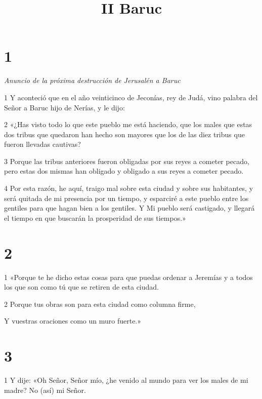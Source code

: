 

\title{II Baruc}

\chapter{1}

\par \textit{Anuncio de la próxima destrucción de Jerusalén a Baruc}

\par 1 Y aconteció que en el año veinticinco de Jeconías, rey de Judá, vino palabra del Señor a Baruc hijo de Nerías, y le dijo:

\par 2 «¿Has visto todo lo que este pueblo me está haciendo, que los males que estas dos tribus que quedaron han hecho son mayores que los de las diez tribus que fueron llevadas cautivas?

\par 3 Porque las tribus anteriores fueron obligadas por sus reyes a cometer pecado, pero estas dos mismas han obligado y obligado a sus reyes a cometer pecado.

\par 4 Por esta razón, he aquí, traigo mal sobre esta ciudad y sobre sus habitantes, y será quitada de mi presencia por un tiempo, y esparciré a este pueblo entre los gentiles para que hagan bien a los gentiles. Y Mi pueblo será castigado, y llegará el tiempo en que buscarán la prosperidad de sus tiempos.»

\chapter{2}

\par 1 «Porque te he dicho estas cosas para que puedas ordenar a Jeremías y a todos los que son como tú que se retiren de esta ciudad.

\par 2 Porque tus obras son para esta ciudad como columna firme,

\par Y vuestras oraciones como un muro fuerte.»

\chapter{3}

\par 1 Y dije: «Oh Señor, Señor mío, ¿he venido al mundo para ver los males de mi madre? No (así) mi Señor.

